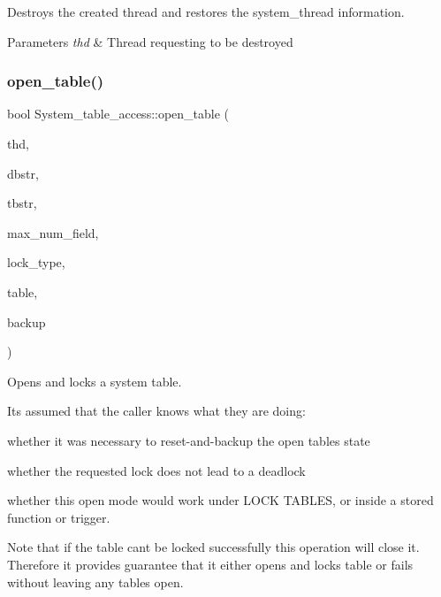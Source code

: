 Destroys the created thread and restores the system\+\_\+thread information.


\begin{DoxyParams}{Parameters}
{\em thd} & Thread requesting to be destroyed \\
\hline
\end{DoxyParams}
\mbox{\label{classSystem__table__access_a8bf7d377c3f2a5e96af95fef28f689c7}} 
\subsubsection{\texorpdfstring{open\+\_\+table()}{open\_table()}}
{\footnotesize\ttfamily bool System\+\_\+table\+\_\+access\+::open\+\_\+table (\begin{DoxyParamCaption}\item[{T\+HD $\ast$}]{thd,  }\item[{const L\+E\+X\+\_\+\+S\+T\+R\+I\+NG}]{dbstr,  }\item[{const L\+E\+X\+\_\+\+S\+T\+R\+I\+NG}]{tbstr,  }\item[{uint}]{max\+\_\+num\+\_\+field,  }\item[{enum thr\+\_\+lock\+\_\+type}]{lock\+\_\+type,  }\item[{\mbox{\hyperlink{structTABLE}{T\+A\+B\+LE}} $\ast$$\ast$}]{table,  }\item[{Open\+\_\+tables\+\_\+backup $\ast$}]{backup }\end{DoxyParamCaption})}

Opens and locks a system table.

It\textquotesingle{}s assumed that the caller knows what they are doing\+:
\begin{DoxyItemize}
\item whether it was necessary to reset-\/and-\/backup the open tables state
\item whether the requested lock does not lead to a deadlock
\item whether this open mode would work under L\+O\+CK T\+A\+B\+L\+ES, or inside a stored function or trigger.
\end{DoxyItemize}

Note that if the table can\textquotesingle{}t be locked successfully this operation will close it. Therefore it provides guarantee that it either opens and locks table or fails without leaving any tables open.


